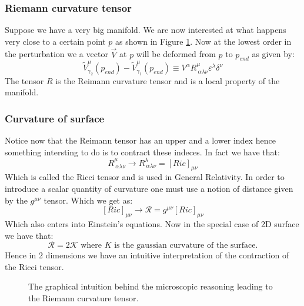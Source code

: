 \documentclass[10pt,a4paper]{book}
\begin{document}
\subsubsection{Riemann curvature tensor}
Suppose we have a very big manifold. We are now interested at what happens very close to a certain point $p$ as shown in Figure \ref{reimann-curvature}. Now at the lowest order in the perturbation we a vector $\overrightarrow{V}$ at $p$ will be deformed from $p$ to $p_{end}$ as given by:
\[
\tilde{V}^\mu_{\gamma_2} (p_{end}) - \tilde{V}^\mu_{\gamma_1}(p_{end}) \equiv V^\alpha R_{~\alpha \lambda \nu}^{\mu} \varepsilon^\lambda \delta^\nu
\]
The tensor $R$ is the Reimann curvature tensor and is a local property of the manifold.

\subsubsection{Curvature of surface}
Notice now that the Reimann tensor has an upper and a lower index hence something intersting to do is to contract these indeces. In fact we have that:
\[
R_{~\alpha \lambda \nu}^\mu \to R_{~\alpha \lambda \nu}^\lambda = [Ric]_{\mu \nu}
\]
Which is called the Ricci tensor and is used in General Relativity. In order to introduce a scalar quantity of curvature one must use a notion of distance given by the $g^{\mu \nu}$ tensor. Which we get as:
\[
[Ric]_{\mu \nu} \to \mathcal{R} = g^{\mu \nu} [Ric]_{\mu \nu}
\] 
Which also enters into Einstein's equations. Now in the special case of 2D surface we have that:
\[
\mathcal{R} = 2 \mathcal{K} \text{ where } K \text{ is the gaussian curvature of the surface.}
\]
Hence in 2 dimensions we have an intuitive interpretation of the contraction of the Ricci tensor. 


\begin{figure} [h]
\label{reimann-curvature}
\centering
{}
\caption{The graphical intuition behind the microscopic reasoning leading to the Riemann curvature tensor.}
\end{figure}
\end{document}
